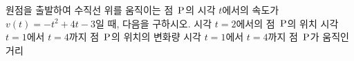 원점을 출발하여 수직선 위를 움직이는 점~$\mathrm{P}$의 시각 $t$에서의 속도가 $v(t)=-t^2+4t-3$일 때, 다음을 구하시오.
 시각 $t=2$에서의 점~$\mathrm{P}$의 위치
 시각 $t=1$에서 $t=4$까지 점~$\mathrm{P}$의 위치의 변화량
 시각 $t=1$에서 $t=4$까지 점~$\mathrm{P}$가 움직인 거리
